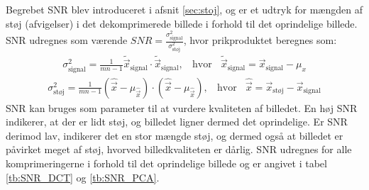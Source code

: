 Begrebet SNR blev introduceret i afsnit \vref{sec:stoj}, og er et udtryk for mængden af støj (afvigelser) i det dekomprimerede billede i forhold til det oprindelige billede. SNR udregnes som værende $SNR = \frac{\sigma^2_{\text{signal}}}{\sigma^{2}_{\text{støj}}}$, hvor prikproduktet beregnes som:
\begin{align}
\sigma^2_{\text{signal}} = \frac{1}{mn-1}  \tilde{\vec{x}}_{\text{signal}} \cdot \tilde{\vec{x}}_{\text{signal}}, \phantom{m} \text{hvor} \phantom{m} \tilde{\vec{x}}_{\text{signal}} = \vec{x}_{\text{signal}} - \mu_{x}
\end{align}
\begin{align}
\sigma^2_{\text{støj}} = \frac{1}{mn - 1} (\hat{\vec{x}} - \mu_{\hat{\vec{x}}}) \cdot (\hat{\vec{x}} - \mu_{\hat{\vec{x}}}), \phantom{m} \text{hvor} \phantom{m} \hat{\vec{x}} = \vec{x}_{\text{støj}} - \vec{x}_{\text{signal}}
\end{align}
SNR kan bruges som parameter til at vurdere kvaliteten af billedet. En høj SNR indikerer, at der er lidt støj, og billedet ligner dermed det oprindelige. Er SNR derimod lav, indikerer det en stor mængde støj, og dermed også at billedet er påvirket meget af støj, hvorved billedkvaliteten er dårlig. SNR udregnes for alle komprimeringerne i forhold til det oprindelige billede og er angivet i tabel \ref{tb:SNR_DCT} og \ref{tb:SNR_PCA}.

